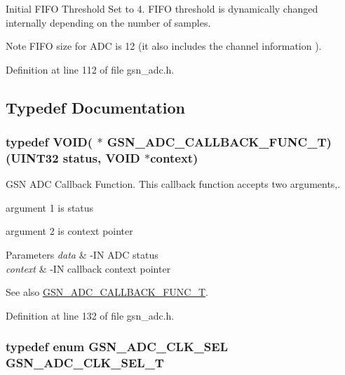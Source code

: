 Initial FIFO Threshold Set to 4. FIFO threshold is dynamically changed internally depending on the number of samples. 

\begin{DoxyNote}{Note}
FIFO size for ADC is 12 (it also includes the channel information ). 
\end{DoxyNote}


Definition at line 112 of file gsn\_\-adc.h.



\subsection{Typedef Documentation}
\hypertarget{a00643_ga988a548c116a5b35c3725a268f74519a}{
\subsubsection[{GSN\_\-ADC\_\-CALLBACK\_\-FUNC\_\-T}]{\setlength{\rightskip}{0pt plus 5cm}typedef VOID( $\ast$ {\bf GSN\_\-ADC\_\-CALLBACK\_\-FUNC\_\-T})({\bf UINT32} status, VOID $\ast$context)}}
\label{a00643_ga988a548c116a5b35c3725a268f74519a}


GSN ADC Callback Function. This callback function accepts two arguments,. 


\begin{DoxyItemize}
\item argument 1 is status
\item argument 2 is context pointer
\end{DoxyItemize}


\begin{DoxyParams}{Parameters}
{\em data} & -\/IN ADC status \\
\hline
{\em context} & -\/IN callback context pointer \\
\hline
\end{DoxyParams}
\begin{DoxySeeAlso}{See also}
\hyperlink{a00643_ga988a548c116a5b35c3725a268f74519a}{GSN\_\-ADC\_\-CALLBACK\_\-FUNC\_\-T}. 
\end{DoxySeeAlso}


Definition at line 132 of file gsn\_\-adc.h.

\hypertarget{a00643_ga36798ea9dfbf3935126b374c4dba00dd}{
\subsubsection[{GSN\_\-ADC\_\-CLK\_\-SEL\_\-T}]{\setlength{\rightskip}{0pt plus 5cm}typedef enum {\bf GSN\_\-ADC\_\-CLK\_\-SEL}  {\bf GSN\_\-ADC\_\-CLK\_\-SEL\_\-T}}}
\label{a00643_ga36798ea9dfbf3935126b374c4dba00dd}


